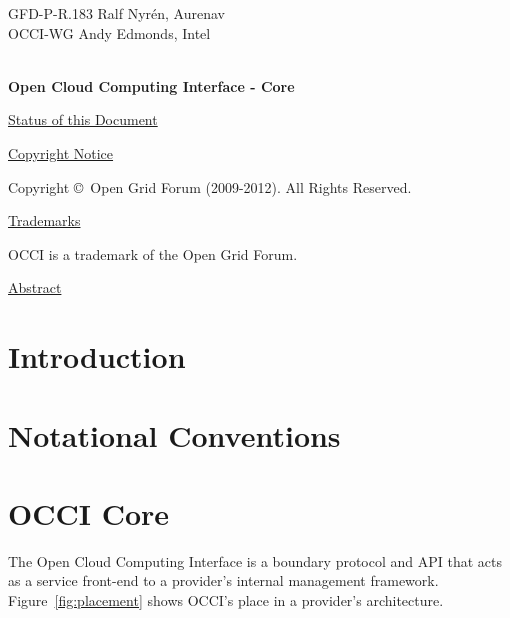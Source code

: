 \documentclass[10pt,a4paper]{article}
\begin{document}
\thispagestyle{empty}

GFD-P-R.183 \hfill  {Ralf Nyrén, Aurenav}\\
OCCI-WG \hfill  Andy Edmonds, Intel\\
\\

\vspace*{0.5in}

\begin{Large}
\textbf{Open Cloud Computing Interface - Core}
\end{Large}

\vspace*{0.5in}

\underline{Status of this Document}



\underline{Copyright Notice}

Copyright \copyright ~Open Grid Forum (2009-2012). All Rights Reserved.

\underline{Trademarks}

OCCI is a trademark of the Open Grid Forum.

\underline{Abstract}



\newpage
\tableofcontents
\newpage

\section{Introduction}


\section{Notational Conventions}


\section{OCCI Core}
The Open Cloud Computing Interface is a boundary protocol and API that
acts as a service front-end to a provider's internal management
framework. Figure~\ref{fig:placement} shows OCCI's place in a
provider's architecture.
\end{document}
